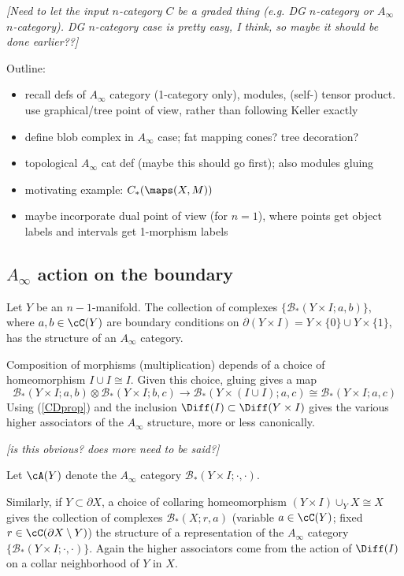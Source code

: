\documentclass[11pt,leqno]{amsart}
\def\bc{{\mathcal B}}
\def\bd{\partial}
\def\sub{\subset}
\def\setmin{\setminus}
\def\nn#1{{{\it \small [#1]}}}
\newcommand{\eq}[1]{\begin{displaymath}#1\end{displaymath}}
\begin{document}
\nn{Need to let the input $n$-category $C$ be a graded thing (e.g. DG
$n$-category or $A_\infty$ $n$-category). DG $n$-category case is pretty
easy, I think, so maybe it should be done earlier??}

\bigskip

Outline:
\begin{itemize}
\item recall defs of $A_\infty$ category (1-category only), modules, (self-) tensor product.
use graphical/tree point of view, rather than following Keller exactly
\item define blob complex in $A_\infty$ case; fat mapping cones?  tree decoration?
\item topological $A_\infty$ cat def (maybe this should go first); also modules gluing
\item motivating example: $C_*(\maps(X, M))$
\item maybe incorporate dual point of view (for $n=1$), where points get
object labels and intervals get 1-morphism labels
\end{itemize}


\subsection{$A_\infty$ action on the boundary}

Let $Y$ be an $n{-}1$-manifold.
The collection of complexes $\{\bc_*(Y\times I; a, b)\}$, where $a, b \in \cC(Y)$ are boundary
conditions on $\bd(Y\times I) = Y\times \{0\} \cup Y\times\{1\}$, has the structure
of an $A_\infty$ category.

Composition of morphisms (multiplication) depends of a choice of homeomorphism
$I\cup I \cong I$.  Given this choice, gluing gives a map
\eq{
    \bc_*(Y\times I; a, b) \otimes \bc_*(Y\times I; b, c) \to \bc_*(Y\times (I\cup I); a, c)
            \cong \bc_*(Y\times I; a, c)
}
Using (\ref{CDprop}) and the inclusion $\Diff(I) \sub \Diff(Y\times I)$ gives the various
higher associators of the $A_\infty$ structure, more or less canonically.

\nn{is this obvious?  does more need to be said?}

Let $\cA(Y)$ denote the $A_\infty$ category $\bc_*(Y\times I; \cdot, \cdot)$.

Similarly, if $Y \sub \bd X$, a choice of collaring homeomorphism
$(Y\times I) \cup_Y X \cong X$ gives the collection of complexes $\bc_*(X; r, a)$
(variable $a \in \cC(Y)$; fixed $r \in \cC(\bd X \setmin Y)$) the structure of a representation of the
$A_\infty$ category $\{\bc_*(Y\times I; \cdot, \cdot)\}$.
Again the higher associators come from the action of $\Diff(I)$ on a collar neighborhood
of $Y$ in $X$.
\end{document}
